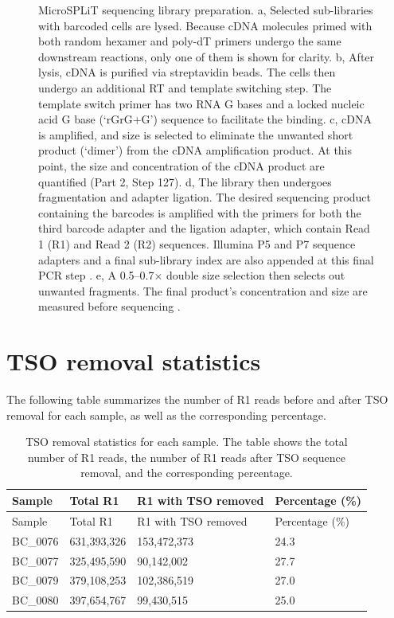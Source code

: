 \documentclass[
  11pt,
  a4paper,
]{report}
\begin{document}
\begin{figure}
\caption{\label{fig-protocol-p2}MicroSPLiT sequencing library
preparation. a, Selected sub-libraries with barcoded cells are lysed.
Because cDNA molecules primed with both random hexamer and poly-dT
primers undergo the same downstream reactions, only one of them is shown
for clarity. b, After lysis, cDNA is purified via streptavidin beads.
The cells then undergo an additional RT and template switching step. The
template switch primer has two RNA G bases and a locked nucleic acid G
base (`rGrG+G') sequence to facilitate the binding. c, cDNA is
amplified, and size is selected to eliminate the unwanted short product
(`dimer') from the cDNA amplification product. At this point, the size
and concentration of the cDNA product are quantified (Part 2, Step 127).
d, The library then undergoes fragmentation and adapter ligation. The
desired sequencing product containing the barcodes is amplified with the
primers for both the third barcode adapter and the ligation adapter,
which contain Read 1 (R1) and Read 2 (R2) sequences. Illumina P5 and P7
sequence adapters and a final sub-library index are also appended at
this final PCR step . e, A 0.5--0.7× double size selection then selects
out unwanted fragments. The final product's concentration and size are
measured before sequencing .}

\end{figure}%

\section{TSO removal statistics}\label{sec-appendix-tso}

The following table summarizes the number of R1 reads before and after
TSO removal for each sample, as well as the corresponding percentage.

\begin{longtable}[]{@{}llll@{}}
\caption{TSO removal statistics for each sample. The table shows the
total number of R1 reads, the number of R1 reads after TSO sequence
removal, and the corresponding
percentage.}\label{tbl-tso-removal}\tabularnewline
\toprule\noalign{}
Sample & Total R1 & R1 with TSO removed & Percentage (\%) \\
\midrule\noalign{}
\endfirsthead
\toprule\noalign{}
Sample & Total R1 & R1 with TSO removed & Percentage (\%) \\
\midrule\noalign{}
\endhead
\bottomrule\noalign{}
\endlastfoot
BC\_0076 & 631,393,326 & 153,472,373 & 24.3 \\
BC\_0077 & 325,495,590 & 90,142,002 & 27.7 \\
BC\_0079 & 379,108,253 & 102,386,519 & 27.0 \\
BC\_0080 & 397,654,767 & 99,430,515 & 25.0 \\
\end{longtable}
\end{document}

